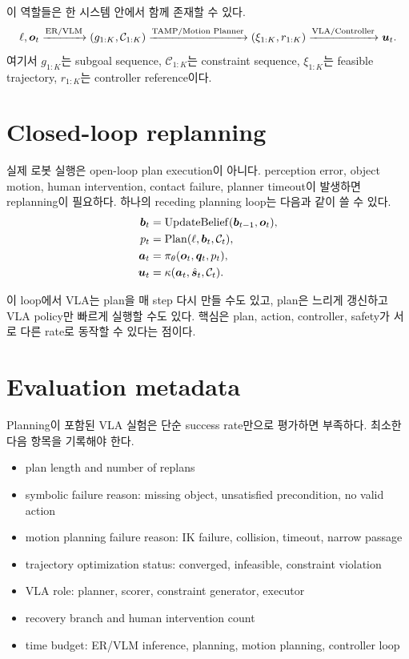 이 역할들은 한 시스템 안에서 함께 존재할 수 있다.
\begin{equation}
  \ell,\bm{o}_t
  \xrightarrow{\text{ER/VLM}}
  (g_{1:K},\mathcal{C}_{1:K})
  \xrightarrow{\text{TAMP/Motion Planner}}
  (\xi_{1:K},r_{1:K})
  \xrightarrow{\text{VLA/Controller}}
  \bm{u}_t.
  \label{eq:vla-planning-pipeline}
\end{equation}
여기서 $g_{1:K}$는 subgoal sequence, $\mathcal{C}_{1:K}$는 constraint sequence, $\xi_{1:K}$는 feasible trajectory, $r_{1:K}$는 controller reference이다.

\section{Closed-loop replanning}

실제 로봇 실행은 open-loop plan execution이 아니다. perception error, object motion, human intervention, contact failure, planner timeout이 발생하면 replanning이 필요하다. 하나의 receding planning loop는 다음과 같이 쓸 수 있다.
\begin{equation}
\begin{aligned}
  \bm{b}_t &= \mathrm{UpdateBelief}(\bm{b}_{t-1},\bm{o}_t),\\
  p_t &= \mathrm{Plan}(\ell,\bm{b}_t,\mathcal{C}_t),\\
  \bm{a}_t &= \pi_\theta(\bm{o}_t,\bm{q}_t,p_t),\\
  \bm{u}_t &= \kappa(\bm{a}_t,\hat{\bm{s}}_t,\mathcal{C}_t).
\end{aligned}
\label{eq:closed-loop-planning}
\end{equation}

이 loop에서 VLA는 plan을 매 step 다시 만들 수도 있고, plan은 느리게 갱신하고 VLA policy만 빠르게 실행할 수도 있다. 핵심은 plan, action, controller, safety가 서로 다른 rate로 동작할 수 있다는 점이다.

\section{Evaluation metadata}

Planning이 포함된 VLA 실험은 단순 success rate만으로 평가하면 부족하다. 최소한 다음 항목을 기록해야 한다.

\begin{itemize}
  \item plan length and number of replans
  \item symbolic failure reason: missing object, unsatisfied precondition, no valid action
  \item motion planning failure reason: IK failure, collision, timeout, narrow passage
  \item trajectory optimization status: converged, infeasible, constraint violation
  \item VLA role: planner, scorer, constraint generator, executor
  \item recovery branch and human intervention count
  \item time budget: ER/VLM inference, planning, motion planning, controller loop
\end{itemize}

